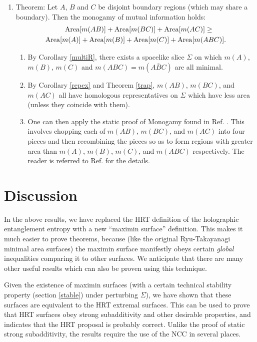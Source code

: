 \documentclass{article}
\begin{document}
\begin{enumerate}[resume]
\item \label{mono} Theorem: Let $A$, $B$ and $C$ be disjoint boundary regions (which may share a boundary).  Then the monogamy of mutual information holds:
\begin{align}
\mathrm{Area}[m(AB)] + \mathrm{Area}[m(BC)] + \mathrm{Area}[m(AC)] \ge \phantom{Mn} \notag \\ 
\mathrm{Area}[m(A)] + \mathrm{Area}[m(B)] + \mathrm{Area}[m(C)]  + \mathrm{Area}[m(ABC)].
\end{align}
	\begin{enumerate}
	\item By Corollary \ref{multiR}, there exists a spacelike slice $\Sigma$ on which $m(A)$, $m(B)$, $m(C)$ and 
$m(ABC) = m(\overline{ABC})$ are all minimal.
	\item By Corollary \ref{repex} and Theorem \ref{trap}, $m(AB)$, $m(BC)$, and $m(AC)$ all have homologous representatives on $\Sigma$ which have less area (unless they coincide with them).
	\item One can then apply the static proof of Monogamy found in Ref. \cite{HHM11}.  This involves chopping each of $m(AB)$, $m(BC)$, and $m(AC)$ into four pieces and then recombining the pieces so as to form regions with greater area than $m(A)$, $m(B)$, $m(C)$, and $m(ABC)$ respectively.  The reader is referred to Ref. \cite{HHM11} for the details.
	\end{enumerate}
\end{enumerate}

\section{Discussion}

In the above results, we have replaced the HRT definition of the holographic entanglement entropy with a new ``maximin surface'' definition.  This makes it much easier to prove theorems, because (like the original Ryu-Takayanagi minimal area surfaces) the maximin surface manifestly obeys certain \emph{global} inequalities comparing it to other surfaces.  We anticipate that there are many other useful results which can also be proven using this technique.

Given the existence of maximin surfaces (with a certain technical stability property (section \ref{stable}) under perturbing $\Sigma$), we have shown that these surfaces are equivalent to the HRT extremal surfaces.  This can be used to prove that HRT surfaces obey strong subadditivity and other desirable properties, and indicates that the HRT proposal is probably correct.  Unlike the proof of static strong subadditivity, the results require the use of the NCC in several places.
\end{document}
